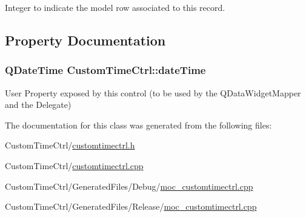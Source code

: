 Integer to indicate the model row associated to this record. 



\subsection{Property Documentation}
\hypertarget{class_custom_time_ctrl_ad091ad8a573db0fdf17366547aab5695}{
\subsubsection[{dateTime}]{\setlength{\rightskip}{0pt plus 5cm}QDateTime CustomTimeCtrl::dateTime}}
\label{class_custom_time_ctrl_ad091ad8a573db0fdf17366547aab5695}


User Property exposed by this control (to be used by the QDataWidgetMapper and the Delegate) 



The documentation for this class was generated from the following files:\begin{DoxyCompactItemize}
\item 
CustomTimeCtrl/\hyperlink{customtimectrl_8h}{customtimectrl.h}\item 
CustomTimeCtrl/\hyperlink{customtimectrl_8cpp}{customtimectrl.cpp}\item 
CustomTimeCtrl/GeneratedFiles/Debug/\hyperlink{_debug_2moc__customtimectrl_8cpp}{moc\_\-customtimectrl.cpp}\item 
CustomTimeCtrl/GeneratedFiles/Release/\hyperlink{_release_2moc__customtimectrl_8cpp}{moc\_\-customtimectrl.cpp}\end{DoxyCompactItemize}
